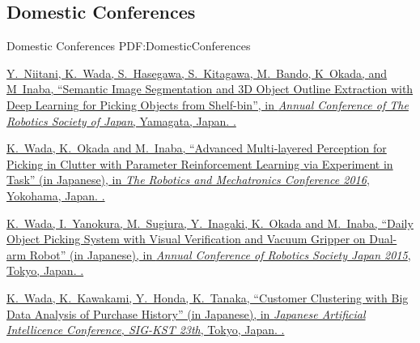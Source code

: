 \documentclass[letterpaper,MMMyyyy,nonstop]{simpleresumecv}
\begin{document}
\begin{body}
\BigGap
\subsection
{Domestic Conferences}
{Domestic Conferences}
{PDF:DomesticConferences}

\GapNoBreak
\NumberedItem{{\CharSpace}[4]}
\href{http://rsj2016.rsj-web.org/}
{Y.~Niitani, \underline{K.~Wada}, S.~Hasegawa, S.~Kitagawa, M.~Bando, K~Okada, and M~Inaba,
``Semantic Image Segmentation and 3D Object Outline Extraction with Deep Learning for Picking Objects from Shelf-bin'',
in \textit{Annual Conference of The Robotics Society of Japan},
Yamagata, Japan.
.}

\GapNoBreak
\NumberedItem{{\CharSpace}[3]}
\href{http://robomech.org/2016/en/}
{\underline{K.~Wada}, K.~Okada and M.~Inaba,
``Advanced Multi-layered Perception for Picking in Clutter with Parameter Reinforcement Learning via Experiment in Task'' (in Japanese),
in \textit{The Robotics and Mechatronics Conference 2016},
Yokohama, Japan.
.}

\GapNoBreak
\NumberedItem{{\CharSpace}[2]}
\href{http://rsj2015.rsj-web.org/}
{\underline{K.~Wada}, I.~Yanokura, M.~Sugiura, Y.~Inagaki, K.~Okada and M.~Inaba,
``Daily Object Picking System with Visual Verification and Vacuum Gripper on Dual-arm Robot'' (in Japanese),
in \textit{Annual Conference of Robotics Society Japan 2015},
Tokyo, Japan.
.}

\GapNoBreak
\NumberedItem{{\CharSpace}[1]}
\href{http://www.sigkst.org/index.php?site_id=&page=\%C2\%E823\%B2\%F3\%B8\%A6\%B5\%E6\%B2\%F1}
{\underline{K.~Wada}, K.~Kawakami, Y.~Honda, K.~Tanaka,
``Customer Clustering with Big Data Analysis of Purchase History'' (in Japanese),
in \textit{Japanese Artificial Intellicence Conference, SIG-KST 23th},
Tokyo, Japan.
.}



\end{body}
\end{document}
